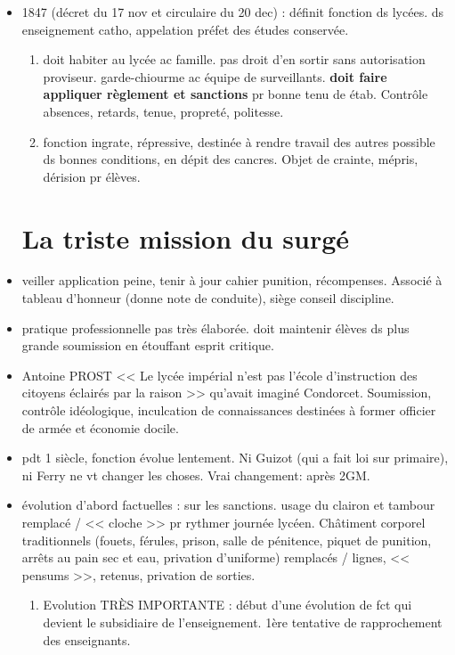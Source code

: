 \documentclass[12pt]{report}
\begin{document}
\begin{itemize}
\item 1847 (décret du 17 nov et circulaire du 20 dec) : définit fonction ds lycées. ds enseignement catho, appelation préfet des études conservée. \\
\begin{enumerate}
\item doit habiter au lycée ac famille. pas droit d'en sortir sans autorisation proviseur. garde-chiourme ac équipe de surveillants. \textbf{doit faire appliquer règlement et sanctions} pr bonne tenu de étab. Contrôle absences, retards, tenue, propreté, politesse. \\
\item fonction ingrate, répressive, destinée à rendre travail des autres possible ds bonnes conditions, en dépit des cancres. Objet de crainte, mépris, dérision pr élèves.
\end{enumerate}


\section{La triste mission du surgé}
\item veiller application peine, tenir à jour cahier punition, récompenses. Associé à tableau d'honneur (donne note de conduite), siège conseil discipline.\\

\item pratique professionnelle pas très élaborée. doit maintenir élèves ds plus grande soumission en étouffant esprit critique. \\

\item Antoine PROST << Le lycée impérial n'est pas l'école d'instruction des citoyens éclairés par la raison >> qu'avait imaginé Condorcet. Soumission, contrôle idéologique, inculcation de connaissances destinées à former officier de armée et économie docile. \\

\item pdt 1 siècle, fonction évolue lentement. Ni Guizot (qui a fait loi sur primaire), ni Ferry ne vt changer les choses. Vrai changement: après 2GM. \\


\item évolution d'abord factuelles : sur les sanctions. usage du clairon et tambour remplacé / << cloche >> pr rythmer journée lycéen. Châtiment corporel traditionnels (fouets, férules, prison, salle de pénitence, piquet de punition, arrêts au pain sec et eau, privation d'uniforme) remplacés / lignes, << pensums >>, retenus, privation de sorties. \\
\begin{enumerate}
\item Evolution TRÈS IMPORTANTE : début d'une évolution de fct qui devient le subsidiaire de l'enseignement. 1ère tentative de rapprochement des enseignants. \\
\end{enumerate}


\end{itemize}
\end{document}
